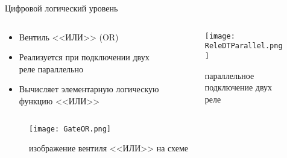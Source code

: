 \documentclass[aspectratio=169,14pt]{beamer}
\begin{document}
\begin{frame}{Цифровой логический уровень}
    \begin{columns}[T,onlytextwidth]
        \begin{column}{0.5\textwidth}
            \begin{itemize}
                \item Вентиль <<ИЛИ>> (OR)
                \item Реализуется при подключении двух реле параллельно
                \item Вычисляет элементарную логическую функцию <<ИЛИ>>
            \end{itemize}
        \end{column}
        \begin{column}{0.5\textwidth}
            \begin{figure}[htp]
                \centering
                \texttt{[image: ReleDTParallel.png]}
                \caption{\tiny{параллельное подключение двух реле}}
                \label{fig:ReleDTParallel}
            \end{figure}
        \end{column}
    \end{columns}
    \begin{figure}[htp]
        \centering
        \texttt{[image: GateOR.png]}
        \caption{\tiny{изображение вентиля <<ИЛИ>> на схеме}}
        \label{fig:GateOR}
    \end{figure}
\end{frame}
\end{document}
